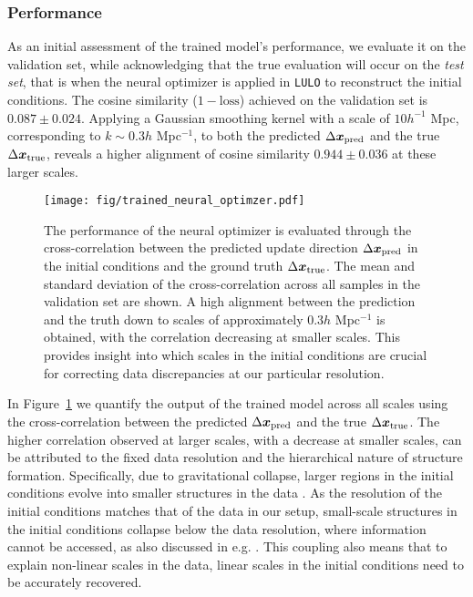 \subsubsection{Performance}
As an initial assessment of the trained model's performance, we evaluate it on the validation set, while acknowledging that the true evaluation will occur on the \textit{test set}, that is when the neural optimizer is applied in \texttt{LULO} to reconstruct the initial conditions. The cosine similarity ($1-\mathrm{loss}$) achieved on the validation set is $0.087 \pm 0.024$. Applying a Gaussian smoothing kernel with a scale of $10h^{-1}$ Mpc, corresponding to $k \sim 0.3h$ Mpc$^{-1}$, to both the predicted $\Delta \boldsymbol{x}_{\mathrm{pred}}$ and the true $\Delta \boldsymbol{x}_{\mathrm{true}}$, reveals a higher alignment of cosine similarity $0.944 \pm 0.036$ at these larger scales. 

\begin{figure}
    \centering
    \texttt{[image: fig/trained\_neural\_optimzer.pdf]}
    \vspace{-1.5em}
    \caption{The performance of the neural optimizer is evaluated through the cross-correlation between the predicted update direction $\Delta \boldsymbol{x}_{\mathrm{pred}}$ in the initial conditions and the ground truth $\Delta \boldsymbol{x}_{\mathrm{true}}$. The mean and standard deviation of the cross-correlation across all samples in the validation set are shown. A high alignment between the prediction and the truth down to scales of approximately $0.3h$ Mpc$^{-1}$ is obtained, with the correlation decreasing at smaller scales. This provides insight into which scales in the initial conditions are crucial for correcting data discrepancies at our particular resolution.} \label{fig:optimizer_performance}
\end{figure}

In Figure~\ref{fig:optimizer_performance} we quantify the output of the trained model across all scales using the cross-correlation between the predicted $\Delta \boldsymbol{x}_{\mathrm{pred}}$ and the true $\Delta \boldsymbol{x}_{\mathrm{true}}$. The higher correlation observed at larger scales, with a decrease at smaller scales, can be attributed to the fixed data resolution and the hierarchical nature of structure formation. Specifically, due to gravitational collapse, larger regions in the initial conditions evolve into smaller structures in the data \citep{Gunn1972}. As the resolution of the initial conditions matches that of the data in our setup, small-scale structures in the initial conditions collapse below the data resolution, where information cannot be accessed, as also discussed in e.g. \citet{Doeser2024}. This coupling also means that to explain non-linear scales in the data, linear scales in the initial conditions need to be accurately recovered. 

